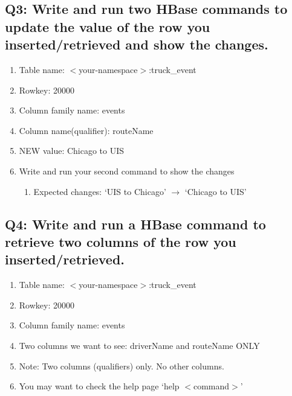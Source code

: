 \documentclass[]{article}
\begin{document}
\subsection*{Q3: Write and run two HBase commands to update the value of the row you inserted/retrieved and show the changes.} 
\begin{enumerate}[before=\itshape,font=\normalfont,label=\alph*.]
	\item Table name: $<$your-namespace$>$:truck\_event
	\item Rowkey: 20000
	\item Column family name: events
	\item Column name(qualifier): routeName
	\item NEW value: Chicago to UIS
	\item Write and run your second command to show the changes
	\begin{enumerate}[label=\roman*.]
		\item Expected changes: ‘UIS to Chicago’ $\rightarrow$ ‘Chicago to UIS’
	\end{enumerate}
\end{enumerate}

\subsection*{Q4: Write and run a HBase command to retrieve two columns of the row you inserted/retrieved.} 
\begin{enumerate}[before=\itshape,font=\normalfont,label=\alph*.]
	\item Table name: $<$your-namespace$>$:truck\_event
	\item Rowkey: 20000
	\item Column family name: events
	\item Two columns we want to see: driverName and routeName ONLY
	\item Note: Two columns (qualifiers) only. No other columns.
	\item You may want to check the help page ‘help $<$command$>$’
\end{enumerate}
\end{document}
